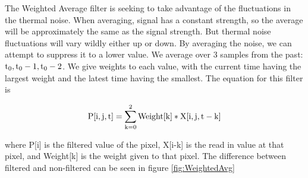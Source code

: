 \documentclass[12pt]{article} %
\begin{document}
The Weighted Average filter is seeking to take advantage of the fluctuations in the thermal noise. When averaging, signal has a constant strength, so the average will be approximately the same as the signal strength. But thermal noise fluctuations will vary wildly either up or down. By averaging the noise, we can attempt to suppress it to a lower value. We average over 3 samples from the past: $\rm{t_0,t_0 -1, t_0-2}$. We give weights to each value, with the current time having the largest weight and the latest time having the smallest. The equation for this filter is

\begin{equation}
\rm{P[i,j,t]} = \sum_{k=0}^{2} \rm{Weight[k]*X[i,j,t-k]}
\end{equation}

where P[i] is the filtered value of the pixel, X[i-k] is the read in value at that pixel, and Weight[k] is the weight given to that pixel. The difference between filtered and non-filtered can be seen in figure \ref{fig:WeightedAvg}
\end{document}

